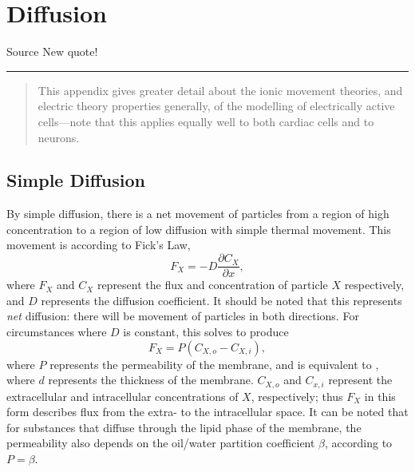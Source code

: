 \documentclass[../thesis-main.tex]{subfiles}
\begin{document}
 
 \chapter{Diffusion}
 \label{ch:diffusion}

  \begin{aquote}{Source}
    {\selectfont
    New quote!
    }
  \end{aquote}
  \rule{\linewidth}{0.25mm}
 
 \begin{quote}
  This appendix gives greater detail about the ionic movement theories, and electric theory properties generally, of the modelling of electrically active cells---note that this applies equally well to both cardiac cells and to neurons.
 \end{quote}

 \section{Simple Diffusion}
 \label{sec:simple-diff}
 By simple diffusion, there is a net movement of particles from a region of high concentration to a region of low diffusion with simple thermal movement. This movement is according to Fick's Law,
 \begin{equation}
  F_X = -D\frac{\partial C_X}{\partial x},
 \end{equation}
 where $F_X$ and $C_X$ represent the flux and concentration of particle $X$ respectively, and $D$ represents the diffusion coefficient. It should be noted that this represents \emph{net} diffusion: there will be movement of particles in both directions. For circumstances where $D$ is constant, this solves to produce
 \begin{equation}
  F_X = P(C_{X,o}-C_{X,i}),
 \end{equation}
 where $P$ represents the permeability of the membrane, and is equivalent to , where $d$ represents the thickness of the membrane. $C_{X,o}$ and $C_{x,i}$ represent the extracellular and intracellular concentrations of $X$, respectively; thus $F_X$ in this form describes flux from the extra- to the intracellular space. It can be noted that for substances that diffuse through the lipid phase of the membrane, the permeability also depends on the oil/water partition coefficient $\beta$, according to $P = \beta$.
 
\end{document}
